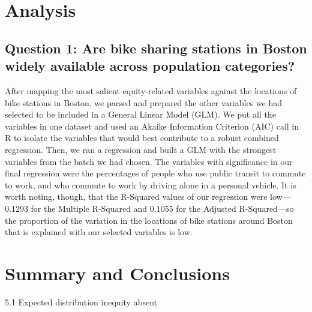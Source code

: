 \documentclass[
  12pt,
]{article}
\begin{document}
\newpage

\hypertarget{analysis}{%
\section{Analysis}\label{analysis}}

\hypertarget{question-1-are-bike-sharing-stations-in-boston-widely-available-across-population-categories}{%
\subsection{Question 1: Are bike sharing stations in Boston widely
available across population
categories?}\label{question-1-are-bike-sharing-stations-in-boston-widely-available-across-population-categories}}

After mapping the most salient equity-related variables against the
locations of bike stations in Boston, we parsed and prepared the other
variables we had selected to be included in a General Linear Model
(GLM). We put all the variables in one dataset and used an Akaike
Information Criterion (AIC) call in R to isolate the variables that
would best contribute to a robust combined regression. Then, we ran a
regression and built a GLM with the strongest variables from the batch
we had chosen. The variables with significance in our final regression
were the percentages of people who use public transit to commute to
work, and who commute to work by driving alone in a personal vehicle. It
is worth noting, though, that the R-Squared values of our regression
were low---0.1293 for the Multiple R-Squared and 0.1055 for the Adjusted
R-Squared---so the proportion of the variation in the locations of bike
stations around Boston that is explained with our selected variables is
low.

\newpage

\hypertarget{summary-and-conclusions}{%
\section{Summary and Conclusions}\label{summary-and-conclusions}}

5.1 Expected distribution inequity absent
\end{document}
